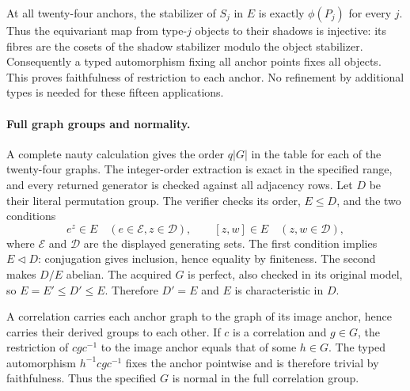 \documentclass[11pt]{article}
\begin{document}
At all twenty-four anchors, the stabilizer of $S_j$ in $E$ is exactly
$\phi(P_j)$ for every $j$. Thus the equivariant map from type-$j$ objects
to their shadows is injective: its fibres are the cosets of the shadow
stabilizer modulo the object stabilizer. Consequently a typed automorphism
fixing all anchor points fixes all objects. This proves faithfulness of
restriction to each anchor. No refinement by additional types is needed
for these fifteen applications.

\paragraph{Full graph groups and normality.}
A complete nauty calculation gives the order $q|G|$ in the table for each
of the twenty-four graphs. The integer-order extraction is exact in the
specified range, and every returned generator is checked against all
adjacency rows. Let $D$ be their literal permutation group. The verifier
checks its order, $E\leq D$, and the two conditions
\[
 e^z\in E\quad(e\in\mathcal E, z\in\mathcal D),\qquad
 [z,w]\in E\quad(z,w\in\mathcal D),
\]
where $\mathcal E$ and $\mathcal D$ are the displayed generating sets.
The first condition implies $E\lhd D$: conjugation gives inclusion, hence
equality by finiteness. The second makes $D/E$ abelian. The acquired $G$
is perfect, also checked in its original model, so
$E=E'\leq D'\leq E$. Therefore $D'=E$ and $E$ is characteristic in $D$.

A correlation carries each anchor graph to the graph of its image anchor,
hence carries their derived groups to each other. If $c$ is a correlation
and $g\in G$, the restriction of $cgc^{-1}$ to the image anchor equals
that of some $h\in G$. The typed automorphism $h^{-1}cgc^{-1}$ fixes the
anchor pointwise and is therefore trivial by faithfulness. Thus the
specified $G$ is normal in the full correlation group.
\end{document}
